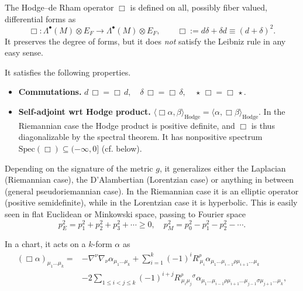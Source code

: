 



\begin{mytheorem}
%
The Hodge--de Rham operator \(\Box\) is defined on all, possibly fiber valued, differential forms as
\begin{equation}
    \Box: \Lambda^\bullet(M) \otimes E_F \to \Lambda^\bullet(M) \otimes E_F, \qquad \Box := d \delta + \delta d \equiv (d + \delta)^2.
\end{equation}
It preserves the degree of forms, but it does \emph{not} satisfy the Leibniz rule in any easy sense.
\smallskip

It satisfies the following properties.
\begin{itemize}
    \item \textbf{Commutations.} $d \,\Box = \Box\, d,\quad \delta\, \Box = \Box\, \delta,\quad \star\, \Box = \Box\, \star$.
    \item \textbf{Self-adjoint wrt Hodge product.} \(\langle \Box \alpha, \beta \rangle_{\mathrm{Hodge}} = \langle \alpha, \Box \beta \rangle_{\mathrm{Hodge}}\).
    In the Riemannian case the Hodge product is positive definite, and $\Box$ is thus diagonalizable by the spectral theorem.
    It has nonpositive spectrum $\text{Spec}(\Box)\subseteq (-\infty,0]$ (cf. below).
\end{itemize}
\smallskip

Depending on the signature of the metric \(g\), it generalizes either the Laplacian (Riemannian case), the D'Alambertian (Lorentzian case) or anything in between (general pseudoriemannian case). 
In the Riemannian case it is an elliptic operator (positive semidefinite), while in the Lorentzian case it is hyperbolic.
This is easily seen in flat Euclidean or Minkowski space, passing to Fourier space
\begin{equation}
    p_E^2 = p_1^2 + p_2^2 + p_3^2 + \cdots \geq 0,\quad p_M^2 = p_0^2 - p_1^2 - p_2^2 - \cdots.
\end{equation}
\smallskip

In a chart, it acts on a $k$-form $\alpha$ as
\begin{align}
    (\Box \alpha)_{\mu_1 \dots \mu_k} 
    =& - \nabla^{\nu} \nabla_{\nu} \alpha_{\mu_1 \dots \mu_k} + \sum_{i=1}^k (-1)^i R^{\rho}_{\ \mu_i} \alpha_{\mu_1 \dots \mu_{i-1} \rho \mu_{i+1} \dots \mu_k} 
    \\
    &  - 2 \sum_{1\leq i < j \leq k} (-1)^{i+j} R^{\rho}_{\,\mu_i \mu_j}{}^{\sigma} \alpha_{\mu_1 \dots \mu_{i-1} \rho \mu_{i+1} \dots \mu_{j-1} \sigma \mu_{j+1} \dots \mu_k},
\end{align}


\end{mytheorem}
